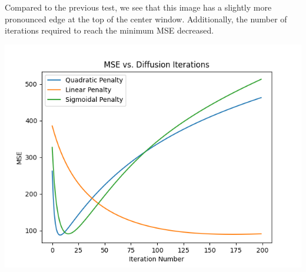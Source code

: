 \documentclass{article}
\begin{document}
  \noindent 
  Compared to the previous test, we see that this image has a slightly
  more pronounced edge at the top of the center window. Additionally,
  the number of iterations required to reach the minimum MSE decreased.
  \begin{center}
    \includegraphics[scale=0.5]{../generated_images/MSE_test2.png}\\
  \end{center}
\end{document}
